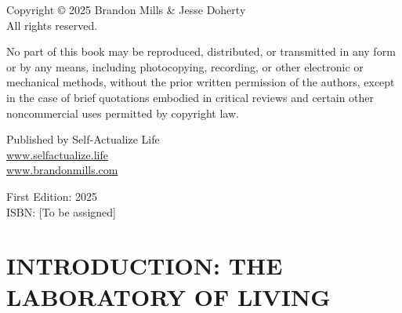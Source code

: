 \documentclass[12pt,openany]{book}
\begin{document}
\cleardoublepage
\thispagestyle{empty}
\vspace*{3in}

\begin{center}
\small
Copyright © 2025 Brandon Mills \& Jesse Doherty\\
All rights reserved.
\end{center}

\vspace{0.4in}

{\footnotesize
No part of this book may be reproduced, distributed, or transmitted in any form or by any means, including photocopying, recording, or other electronic or mechanical methods, without the prior written permission of the authors, except in the case of brief quotations embodied in critical reviews and certain other noncommercial uses permitted by copyright law.
}

\vspace{0.4in}

\begin{center}
\small
Published by Self-Actualize Life\\
\url{www.selfactualize.life}\\
\url{www.brandonmills.com}

\vspace{0.28in}

First Edition: 2025\\
ISBN: [To be assigned]
\end{center}

\cleardoublepage
\tableofcontents

\chapter{INTRODUCTION: THE LABORATORY OF LIVING}
\end{document}
